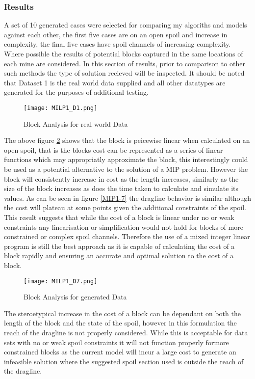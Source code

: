 \subsubsection{Results}
A set of 10 generated cases were selected for comparing my algoriths and models against each other, the first five cases are on an open spoil and increase in complexity, the final five cases have spoil channels of increasing complexity. Where possible the results of potential blocks captured in the same locations of each mine are considered. In this section of results, prior to comparison to other such methods the type of solution recieved will be inspected.	It should be noted that Dataset 1 is the real world data supplied and all other datatypes are generated for the purposes of additional testing. 
\begin{figure}[h]
\label{MIP1-1}
\caption{Block Analysis for real world Data}
\texttt{[image: MILP1\_D1.png]}
\end{figure}
The above figure \ref{MIP1-1} shows that the block is peicewise linear when calculated on an open spoil, that is the blocks cost can be represented as a series of linear functions which may appropriatly approximate the block, this interestingly could be used as a potential alternative to the solution of a MIP problem. However the block will consistently increase in cost as the length increases, similarly as the size of the block increases as does the time taken to calculate and simulate its values. As can be seen in  figure \ref{MIP1-7} the dragline behavior is similar although the cost will plateau at some points given the additional constraints of the spoil. This result suggests that while the cost of a block is linear under no or weak constraints any linearisation or simplification would not hold for blocks of more constrained or complex spoil channels. Therefore the use of a mixed integer linear program is still the best approach as it is capable of calculating the cost of a block rapidly and ensuring an accurate and optimal solution to the cost of a block. 

\begin{figure}[h!]
\label{MIP1-1}
\caption{Block Analysis for generated Data}
\texttt{[image: MILP1\_D7.png]}
\end{figure}
The steroetypical increase in the cost of a block can be dependant on both the length of the block and the state of the spoil, however in this formulation the reach of the dragline is not properly considered. While this is acceptable for data sets with no or weak spoil constraints it will not function properly formore constrained blocks as the current model will incur a large cost to generate an infeasible solution where the suggested spoil section used is outside the reach of the dragline. 
